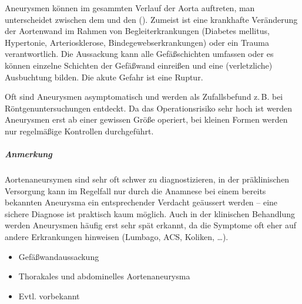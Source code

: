 {%
Aneurysmen können im gesammten Verlauf der Aorta auftreten, man unterscheidet
zwischen dem  und
den  ().  Zumeist
ist eine krankhafte Veränderung der Aortenwand im
Rahmen von Begleiterkrankungen (Diabetes mellitus, Hypertonie,
Arteriosklerose,
Bindegewebserkrankungen) oder ein Trauma
verantwortlich. Die Aussackung kann alle Gefäßschichten
umfassen oder es können einzelne Schichten der
Gefäßwand einreißen und eine (verletzliche) Ausbuchtung
bilden. 
Die akute Gefahr ist eine
Ruptur. 

Oft sind Aneurysmen asymptomatisch und werden als
Zufallsbefund z.\,B. bei Röntgenuntersuchungen entdeckt. Da
das Operationsrisiko sehr hoch ist werden Aneurysmen erst ab
einer gewissen Größe operiert, bei kleinen Formen werden nur
regelmäßige Kontrollen durchgeführt.

\subparagraph{Anmerkung} Aortenaneursymen sind sehr oft
schwer zu diagnostizieren, in der präklinischen Versorgung
kann im Regelfall nur durch die Anamnese bei einem bereits
bekannten Aneurysma ein entsprechender Verdacht geäussert
werden -- eine sichere Diagnose ist praktisch kaum möglich.
Auch in der klinischen Behandlung werden Aneurysmen häufig
erst sehr spät erkannt, da die Symptome oft eher auf andere
Erkrankungen hinweisen (Lumbago, ACS, Koliken, \ldots). 

}
{%
\begin{itemize}
  \item Gefäßwandaussackung
  \item Thorakales und abdominelles Aortenaneurysma
  \item Evtl. vorbekannt
\end{itemize}
}{}{}{}


